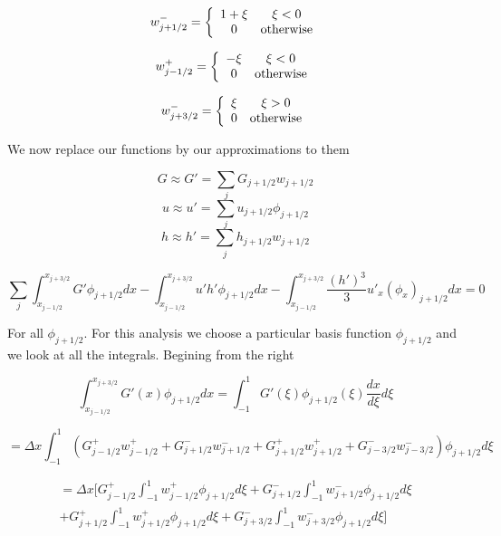 \documentclass[12pt]{article}
\begin{document}
\begin{equation}
w^-_{j+1/2} = \left\lbrace \begin{array}{c c}
1+\xi & \xi < 0 \\
0 & \text{otherwise}
\end{array} 
\right.
\end{equation}

\begin{equation}
w^+_{j-1/2} = \left\lbrace \begin{array}{c c}
-\xi & \xi < 0 \\
0 & \text{otherwise}
\end{array} 
\right.
\end{equation}

\begin{equation}
w^-_{j+3/2} = \left\lbrace \begin{array}{c c}
\xi & \xi > 0 \\
0 & \text{otherwise}
\end{array} 
\right.
\end{equation}

We now replace our functions by our approximations to them

\[G \approx G' = \sum_{j}G_{j+1/2}w_{j+1/2}\]
\[u \approx u' = \sum_{j}u_{j+1/2}\phi_{j+1/2}\]
\[h \approx h' = \sum_{j}h_{j+1/2}w_{j+1/2}\]

\[\sum_{j}\int_{x_{j-1/2}}^{x_{j+3/2}} G'\phi_{j+1/2} dx - \int_{x_{j-1/2}}^{x_{j+3/2}} u'h'\phi_{j+1/2} dx -  \int_{x_{j-1/2}}^{x_{j+3/2}}\frac{(h')^3}{3}u'_{x}(\phi_{x})_{j+1/2}dx = 0 \]

For all $\phi_{j+1/2}$. For this analysis we choose a particular basis function $\phi_{j+1/2}$ and we look at all the integrals. Begining from the right

\[\int_{x_{j-1/2}}^{x_{j+3/2}} G'(x)\phi_{j+1/2} dx = \int_{-1}^{1} G'(\xi)\phi_{j+1/2}(\xi) \frac{d x}{d\xi}d\xi\]

\[= \Delta x \int_{-1}^{1} \left(G^+_{j- 1/2}w^+_{j - 1/2} + G^-_{j+ 1/2}w^-_{j + 1/2} + G^+_{j+ 1/2}w^+_{j + 1/2} + G^-_{j- 3/2}w^-_{j - 3/2}     \right)\phi_{j+1/2} d\xi\]

\begin{multline}
= \Delta x [G^+_{j- 1/2} \int_{-1}^{1} w^+_{j - 1/2}\phi_{j+1/2} d\xi + G^-_{j+ 1/2} \int_{-1}^{1} w^-_{j + 1/2}\phi_{j+1/2} d\xi  \\+ G^+_{j+ 1/2} \int_{-1}^{1} w^+_{j + 1/2}\phi_{j+1/2} d\xi + G^-_{j+ 3/2} \int_{-1}^{1} w^-_{j + 3/2}\phi_{j+1/2} d\xi ]
\end{multline}
\end{document}
